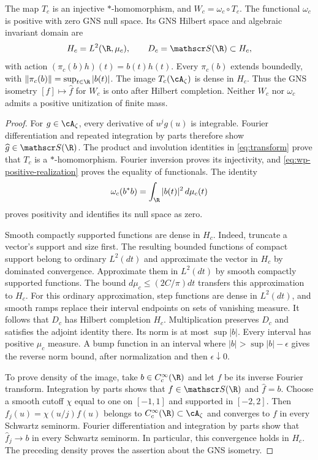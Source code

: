 \begin{theorem}
\label{thm:wp-carrier}
The map $T_c$ is an injective $*$-homomorphism, and
$W_c=\omega_c\circ T_c$.
The functional $\omega_c$ is positive with zero GNS null space.
Its GNS Hilbert space and algebraic invariant domain are
\[
 H_c=L^2(\R,\mu_c),\qquad D_c=\mathscr S(\R)\subset H_c,
\]
with action $(\pi_c(b)h)(t)=b(t)h(t)$.
Every $\pi_c(b)$ extends boundedly, with
$\|\pi_c(b)\|=\sup_{t\in\R}|b(t)|$.
The image $T_c(\cA_\zeta)$ is dense in $H_c$.
Thus the GNS isometry $[f]\mapsto\widehat f$ for $W_c$ is onto
after Hilbert completion.
Neither $W_c$ nor $\omega_c$ admits a positive unitization of finite mass.
\end{theorem}
\begin{proof}
For $g\in\cA_\zeta$, every derivative of $u^j g(u)$ is integrable.
Fourier differentiation and repeated integration by parts therefore show
$\widehat g\in\mathscr S(\R)$.
The product and involution identities in \eqref{eq:transform} prove
that $T_c$ is a $*$-homomorphism.
Fourier inversion proves its injectivity, and
\eqref{eq:wp-positive-realization} proves the equality of functionals.
The identity
\[
 \omega_c(b^*b)=\int_{\R}|b(t)|^2\,d\mu_c(t)
\]
proves positivity and identifies its null space as zero.

Smooth compactly supported functions are dense in $H_c$.
Indeed, truncate a vector's support and size first.
The resulting bounded functions of compact support belong to ordinary
$L^2(dt)$ and approximate the vector in $H_c$ by dominated convergence.
Approximate them in $L^2(dt)$ by smooth compactly supported functions.
The bound $d\mu_c\leq(2C/\pi)dt$ transfers this approximation to $H_c$.
For this ordinary approximation, step functions are dense in $L^2(dt)$,
and smooth ramps replace their interval endpoints on sets of vanishing measure.
It follows that $D_c$ has Hilbert completion $H_c$.
Multiplication preserves $D_c$ and satisfies the adjoint identity there.
Its norm is at most $\sup|b|$.
Every interval has positive $\mu_c$ measure.
A bump function in an interval where $|b|>\sup|b|-\epsilon$
gives the reverse norm bound, after normalization and then
$\epsilon\downarrow0$.

To prove density of the image, take $b\in C_c^\infty(\R)$ and
let $f$ be its inverse Fourier transform.
Integration by parts shows that $f\in\mathscr S(\R)$ and $\widehat f=b$.
Choose a smooth cutoff $\chi$ equal to one on $[-1,1]$ and supported
in $[-2,2]$.
Then $f_j(u)=\chi(u/j)f(u)$ belongs to $C_c^\infty(\R)\subset\cA_\zeta$
and converges to $f$ in every Schwartz seminorm.
Fourier differentiation and integration by parts show that
$\widehat f_j\to b$ in every Schwartz seminorm.
In particular, this convergence holds in $H_c$.
The preceding density proves the assertion about the GNS isometry.


\end{proof}

